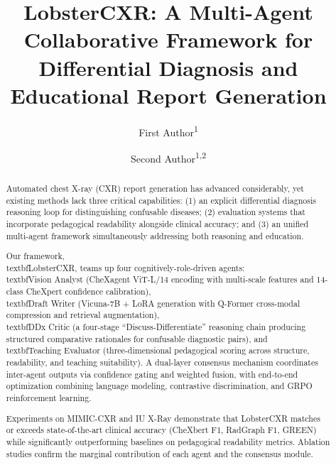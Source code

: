 \documentclass[runningheads,10pt]{llncs}
\begin{document}
\title{LobsterCXR: A Multi-Agent Collaborative Framework for Differential Diagnosis and Educational Report Generation}

\author{First Author\textsuperscript{1} \and Second Author\textsuperscript{1,2}}

\maketitle

\begin{abstract}
Automated chest X-ray (CXR) report generation has advanced considerably, yet existing methods lack three critical capabilities: (1) an explicit differential diagnosis reasoning loop for distinguishing confusable diseases; (2) evaluation systems that incorporate pedagogical readability alongside clinical accuracy; and (3) an unified multi-agent framework simultaneously addressing both reasoning and education.

Our framework, \\textbf{LobsterCXR}, teams up four cognitively-role-driven agents: \\textbf{Vision Analyst} (CheXagent ViT-L/14 encoding with multi-scale features and 14-class CheXpert confidence calibration), \\textbf{Draft Writer} (Vicuna-7B + LoRA generation with Q-Former cross-modal compression and retrieval augmentation), \\textbf{DDx Critic} (a four-stage ``Discuss-Differentiate'' reasoning chain producing structured comparative rationales for confusable diagnostic pairs), and \\textbf{Teaching Evaluator} (three-dimensional pedagogical scoring across structure, readability, and teaching suitability). A dual-layer consensus mechanism coordinates inter-agent outputs via confidence gating and weighted fusion, with end-to-end optimization combining language modeling, contrastive discrimination, and GRPO reinforcement learning.

Experiments on MIMIC-CXR and IU X-Ray demonstrate that LobsterCXR matches or exceeds state-of-the-art clinical accuracy (CheXbert F1, RadGraph F1, GREEN) while significantly outperforming baselines on pedagogical readability metrics. Ablation studies confirm the marginal contribution of each agent and the consensus module.

\end{abstract}
\end{document}
